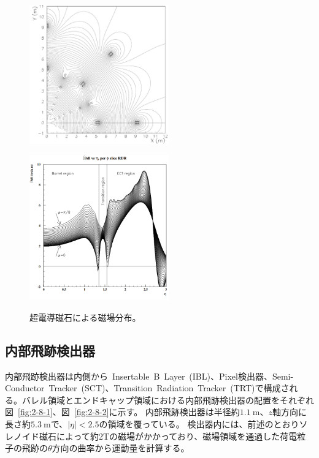 \begin{figure}[h]
  \begin{minipage}[b]{0.48\linewidth}
      \centering
      \includegraphics[clip, width=6cm]{fig/2/FMBmap.pdf}
      \label{fig:2-7-1}
  \end{minipage}
    \begin{minipage}[b]{0.48\linewidth}
      \centering
      \includegraphics[clip, width=6cm]{fig/2/bdl_cut.png}
      \label{fig:2-7-2}
  \end{minipage}
  \caption{超電導磁石による磁場分布\cite{article:ATLASMagneticField}。}
\end{figure}

\subsection{内部飛跡検出器}\label{2-2-3}
内部飛跡検出器は内側から~Insertable~B~Layer~(IBL)、Pixel検出器、Semi-Conductor~Tracker~(SCT)、Transition~Radiation~Tracker~(TRT)で構成される。バレル領域とエンドキャップ領域における内部飛跡検出器の配置をそれぞれ図~\ref{fig:2-8-1}、図~\ref{fig:2-8-2}に示す。
内部飛跡検出器は半径約$\SI{1.1}{\m}$、$z$軸方向に長さ約$\SI{5.3}{\m}$で、$|\eta|<2.5$の領域を覆っている。
検出器内には、前述のとおりソレノイド磁石によって約2Tの磁場がかかっており、磁場領域を通過した荷電粒子の飛跡の$\theta$方向の曲率から運動量を計算する。

